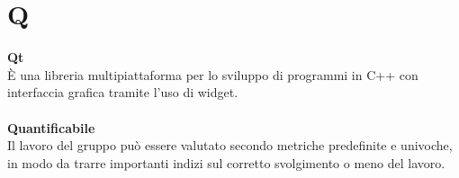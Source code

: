 \section{Q}
\textbf{Qt}\\
È una libreria multipiattaforma per lo sviluppo di programmi in C++ con interfaccia grafica tramite l'uso di widget. \\ \\
\textbf{Quantificabile} \\
Il lavoro del gruppo può essere valutato secondo metriche predefinite e univoche, in modo da trarre importanti indizi sul corretto svolgimento o meno del lavoro. \\
\clearpage